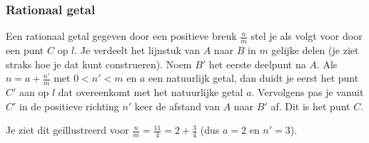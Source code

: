\begin{center}
		
\end{center}




\subsubsection{Rationaal getal}

Een rationaal getal gegeven door een positieve breuk $\frac{n}{m}$ stel je als volgt voor door een punt $C$ op $l$.
Je verdeelt het lijnstuk van $A$ naar $B$ in $m$ gelijke delen (je ziet straks hoe je dat kunt construeren).
Noem $B'$ het eerste deelpunt na $A$.
Als $n=a+\frac{n'}{m}$ met $0<n'<m$ en $a$ een natuurlijk getal, dan duidt je eerst het punt $C'$ aan op $l$ dat overeenkomt met het natuurlijke getal $a$.
Vervolgens pas je vanuit $C'$ in de positieve richting $n'$ keer de afstand van $A$ naar $B'$ af.
Dit is het punt $C$.

Je ziet dit ge\"illustreerd voor $\frac{n}{m}=\frac{11}{4}=2+\frac{3}{4}$ (dus $a=2$ en $n'=3$).\vspace{5mm}


%

